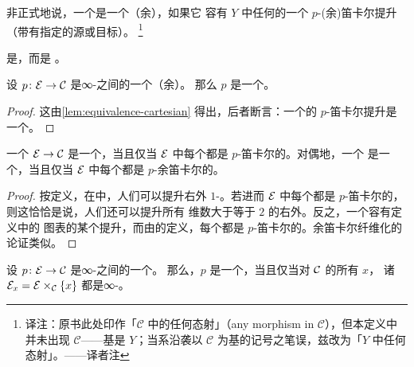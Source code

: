 非正式地说，一个\trInnerFibration{}是一个（余）\trCartesianFibration{}，如果它
容有 $Y$ 中任何\trMorphism{}的一个 $p$-(余)笛卡尔提升（带有指定的源或目标）。%
\footnote{译注：原书此处印作「$\mathcal{C}$ 中的任何态射」（any morphism in
$\mathcal{C}$），但本定义中并未出现 $\mathcal{C}$——基是 $Y$；当系沿袭以
$\mathcal{C}$ 为基的记号之笔误，兹改为「$Y$ 中任何态射」。——译者注}

\begin{example*}
\trRightFibration{}是\trCartesianFibration{}，而\trLeftFibration{}是%
\trCocartesianFibration{}。
\end{example*}

\begin{lemma}\label{lem:cartesian-fibration-isofibration}
设 $p\colon \mathcal{E} \to \mathcal{C}$ 是∞-\trCategories{}之间的一个（余）\trCartesianFibration{}。
那么 $p$ 是一个\trIsofibration{}。
\end{lemma}

\begin{proof}
这由\cref{lem:equivalence-cartesian} 得出，后者断言：一个\trEquivalence{}的
$p$-笛卡尔提升是一个\trEquivalence{}。
\end{proof}

\begin{lemma}\label{lem:cartesian-fibration-right-fibration}
一个\trCartesianFibration{} $\mathcal{E} \to \mathcal{C}$ 是一个\trRightFibration{}，当且仅当
$\mathcal{E}$ 中每个\trMorphism{}都是 $p$-笛卡尔的。对偶地，一个\trCocartesianFibration{}%
是一个\trLeftFibration{}，当且仅当 $\mathcal{E}$ 中每个\trMorphism{}都是 $p$-余笛卡尔的。
\end{lemma}

\begin{proof}
按定义，在\trCartesianFibration{}中，人们可以提升右外 $1$-\trHorn{}。若进而
$\mathcal{E}$ 中每个\trMorphism{}都是 $p$-笛卡尔的，则这恰恰是说，人们还可以提升所有
维数大于等于 $2$ 的右外\trHorn{}。反之，一个\trRightFibration{}容有定义中的
图表的某个提升，而由\trRightFibration{}的定义，每个\trMorphism{}都是
$p$-笛卡尔的。余笛卡尔纤维化的论证类似。
\end{proof}

\begin{proposition}\label{prop:cartesian-fibration-fibres-groupoids}
设 $p\colon \mathcal{E} \to \mathcal{C}$ 是∞-\trCategories{}之间的一个\trCartesianFibration{}。
那么，$p$ 是一个\trRightFibration{}，当且仅当对 $\mathcal{C}$ 的所有\trObject{} $x$，
诸\trFibre{} $\mathcal{E}_x = \mathcal{E} \times_{\mathcal{C}} \{x\}$ 都是∞-\trGroupoid{}。
\end{proposition}

